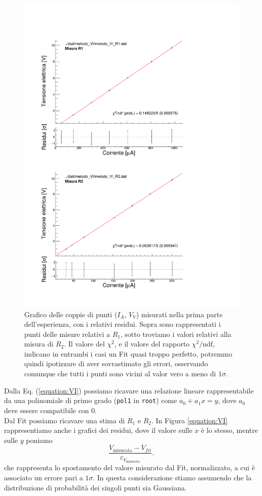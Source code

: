 \documentclass[
    reprint, 
    superscriptaddress, 
    altaffilletter, 
    amsmath, 
    amssymb, 
    a4paper
]{revtex4-2}
\newcommand{\reffig}[1]{Figura {\ref{#1}}}%
\newcommand{\refeqn}[1]{Eq. ({\ref{#1}})}%
\newcommand{\ChiSqr}{$\chi^2$\space}
\newcommand{\ChiNdf}{$\chi^2/\text{ndf}$}
\newcommand{\cernroot}{\texttt{root}}
\newcommand{\mstdErr}[1]{\varepsilon_{#1}}
\begin{document}
    \begin{figure}
        \centering
        \includegraphics[width=\linewidth]{misura_R1_R2.pdf}
        \caption{Grafico delle coppie di punti ($I_A$, $V_V$) misurati nella prima parte dell'esperienza, con i relativi residui. Sopra sono rappresentati i punti delle misure relativi a $R_1$, sotto troviamo i valori relativi alla misura di $R_2$. Il valore del \ChiSqr, e il valore del rapporto \ChiNdf, indicano in entrambi i casi un Fit quasi troppo perfetto, potremmo quindi ipotizzare di aver sovrastimato gli errori, osservando comunque che tutti i punti sono vicini al valor vero a meno di $1\sigma$.}
        \label{figure:plot_R1_R2}
    \end{figure}

    Dalla \refeqn{equation:VI} possiamo ricavare una relazione lineare rappresentabile da una polinomiale di primo grado (\verb|pol1| in \cernroot) come $a_0 + a_1x = y$, dove $a_0$ deve essere compatibile con 0.\\
    Dal Fit possiamo ricavare una stima di $R_1$ e $R_2$. In \reffig{equation:VI} rappresentiamo anche i grafici dei residui, dove il valore sulle $x$ è lo stesso, mentre sulle $y$ poniamo
    \[
        \frac{V_{\text{misurata}}-V_{fit}}{\mstdErr{V_{\text{misurata}}}}.
    \]
    che rappresenta lo spostamento del valore misurato dal Fit, normalizzato, a cui è associato un errore pari a $1\sigma$. In questa considerazione stiamo assumendo che la distribuzione di probabilità dei singoli punti sia Gaussiana.
\end{document}
